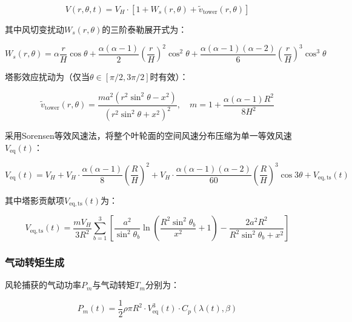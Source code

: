 \documentclass[withoutpreface,bwprint]{cumcmthesis}
\begin{document}
\begin{equation}
V(r,\theta,t) = V_H \cdot [1 + W_s(r,\theta) + \tilde{v}_{\mathrm{tower}}(r,\theta)]
\label{eq:wind_field}
\end{equation}

其中风切变扰动$W_s(r,\theta)$的三阶泰勒展开式为：

\begin{equation}
W_s(r,\theta) = \alpha\frac{r}{H}\cos\theta + \frac{\alpha(\alpha-1)}{2}\left(\frac{r}{H}\right)^2\cos^2\theta + \frac{\alpha(\alpha-1)(\alpha-2)}{6}\left(\frac{r}{H}\right)^3\cos^3\theta
\label{eq:wind_shear}
\end{equation}

塔影效应扰动为（仅当$\theta\in[\pi/2,3\pi/2]$时有效）：

\begin{equation}
\tilde{v}_{\mathrm{tower}}(r,\theta) = \frac{ma^2(r^2\sin^2\theta - x^2)}{(r^2\sin^2\theta + x^2)^2},\quad m = 1 + \frac{\alpha(\alpha-1)R^2}{8H^2}
\label{eq:tower_shadow}
\end{equation}

采用Sorensen等效风速法\cite{sorensen2002wind}，将整个叶轮面的空间风速分布压缩为单一等效风速$V_{\mathrm{eq}}(t)$：

\begin{equation}
V_{\mathrm{eq}}(t) = V_H + V_H\cdot\frac{\alpha(\alpha-1)}{8}\left(\frac{R}{H}\right)^2 + V_H\cdot\frac{\alpha(\alpha-1)(\alpha-2)}{60}\left(\frac{R}{H}\right)^3\cos 3\theta + V_{\mathrm{eq,ts}}(t)
\label{eq:equiv_wind}
\end{equation}

其中塔影贡献项$V_{\mathrm{eq,ts}}(t)$为：

\begin{equation}
V_{\mathrm{eq,ts}}(t) = \frac{mV_H}{3R^2}\sum_{b=1}^{3}\left[\frac{a^2}{\sin^2\theta_b}\ln\left(\frac{R^2\sin^2\theta_b}{x^2}+1\right) - \frac{2a^2R^2}{R^2\sin^2\theta_b+x^2}\right]
\label{eq:tower_equiv}
\end{equation}

\subsubsection{气动转矩生成}

风轮捕获的气动功率$P_m$与气动转矩$T_m$分别为：

\begin{equation}
P_m(t) = \frac{1}{2}\rho\pi R^2 \cdot V_{\mathrm{eq}}^3(t) \cdot C_p(\lambda(t),\beta)
\label{eq:aero_power}
\end{equation}
\end{document}
